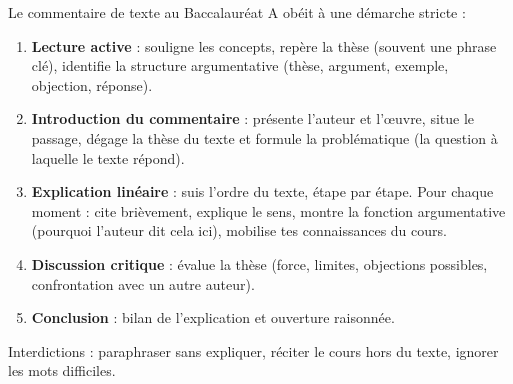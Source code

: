 \documentclass[11pt]{article}
\begin{document}
\begin{methode}
Le commentaire de texte au Baccalauréat A obéit à une démarche stricte :
\begin{enumerate}
\item \textbf{Lecture active} : souligne les concepts, repère la thèse (souvent une phrase clé), identifie la structure argumentative (thèse, argument, exemple, objection, réponse).
\item \textbf{Introduction du commentaire} : présente l'auteur et l'œuvre, situe le passage, dégage la thèse du texte et formule la problématique (la question à laquelle le texte répond).
\item \textbf{Explication linéaire} : suis l'ordre du texte, étape par étape. Pour chaque moment : cite brièvement, explique le sens, montre la fonction argumentative (pourquoi l'auteur dit cela ici), mobilise tes connaissances du cours.
\item \textbf{Discussion critique} : évalue la thèse (force, limites, objections possibles, confrontation avec un autre auteur).
\item \textbf{Conclusion} : bilan de l'explication et ouverture raisonnée.
\end{enumerate}
Interdictions : paraphraser sans expliquer, réciter le cours hors du texte, ignorer les mots difficiles.
\end{methode}
\end{document}
